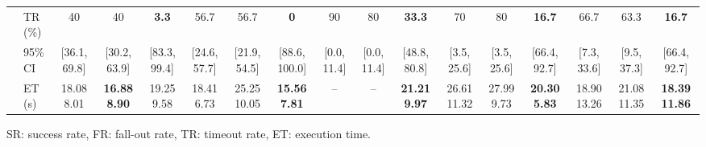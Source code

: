 \begin{table}[t]
{\begin{tabular}{@{}ll*{3}{c}|*{3}{c}|*{3}{c}|*{3}{c}|*{3}{c}@{}}
 & TR (\%) & 40 & 40 & \textbf{3.3} & 56.7 & 56.7 & \textbf{0} & 90 & 80 & \textbf{33.3} & 70 & 80 & \textbf{16.7} & 66.7 & 63.3 & \textbf{16.7} \\
 & 95\% CI & [36.1, 69.8] & [30.2, 63.9] & [83.3, 99.4] & [24.6, 57.7] & [21.9, 54.5] & [88.6, 100.0] & [0.0, 11.4] & [0.0, 11.4] & [48.8, 80.8] & [3.5, 25.6] & [3.5, 25.6] & [66.4, 92.7] & [7.3, 33.6] & [9.5, 37.3] & [66.4, 92.7] \\
 & ET (s) & 18.08 \textpm{} 8.01 & \textbf{16.88 \textpm{} 8.90} & 19.25 \textpm{} 9.58 & 18.41 \textpm{} 6.73 & 25.25 \textpm{} 10.05 & \textbf{15.56 \textpm{} 7.81} & -- & -- & \textbf{21.21 \textpm{} 9.97} & 26.61 \textpm{} 11.32 & 27.99 \textpm{} 9.73 & \textbf{20.30 \textpm{} 5.83} & 18.90 \textpm{} 13.26 & 21.08 \textpm{} 11.35 & \textbf{18.39 \textpm{} 11.86} \\
\hline
\end{tabular}
}
\par\smallskip
\parbox{\textwidth}{\scriptsize SR: success rate, FR: fall-out rate, TR: timeout rate, ET: execution time.}
\end{table}

\begin{table}[t]
\centering
\caption{ \textcolor{red}{Contributing factors} in real-world experiments.}
\label{tab:scsp_real_world_events}
\setlength{\tabcolsep}{1.5pt}
\renewcommand{\arraystretch}{1.05}
\scriptsize
{}
\end{table}

